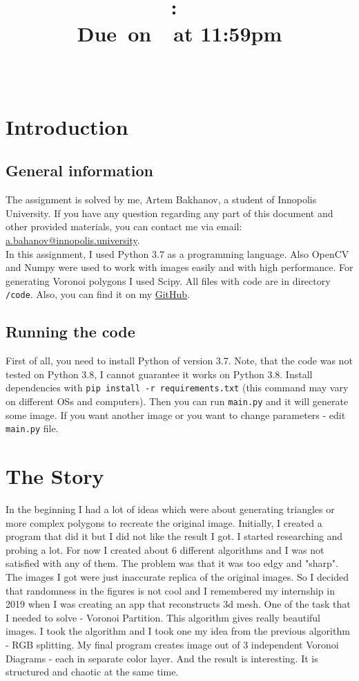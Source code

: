 \documentclass{article}
\title{
    \vspace{2in}
    \textmd{\textbf{\hmwkClass:\ \hmwkTitle}}\\
    \normalsize\vspace{0.1in}\small{Due\ on\ \hmwkDueDate\ at 11:59pm}\\
    \vspace{0.1in}\large{\textit{\hmwkClassInstructor\ }}
    \vspace{3in}
}
\author{\hmwkAuthorName}
\date{}
\begin{document}
\maketitle

\pagebreak

\tableofcontents

\pagebreak

\section{Introduction}
\subsection{General information}
    The assignment is solved by me, Artem Bakhanov, a student of Innopolis University. If you have any question regarding any part of this document and other provided materials, you can contact me via email: \href{mailto:a.bahanov@innopolis.university}{a.bahanov@innopolis.university}.\\
    In this assignment, I used Python 3.7 as a programming language. Also OpenCV and Numpy were used to work with images easily and with high performance. For generating Voronoi polygons I used Scipy. All files with code are in directory \texttt{/code}. Also, you can find it on my \href{https://github.com/artembakhanov/ComputerCanDoArt}{GitHub}.
\subsection{Running the code}
First of all, you need to install Python of version 3.7. Note, that the code was not tested on Python 3.8, I cannot guarantee it works on Python 3.8. Install dependencies with \texttt{pip install -r requirements.txt} (this command may vary on different OSs and computers). Then you can run \texttt{main.py} and it will generate some image. If you want another image or you want to change parameters - edit \texttt{main.py} file. 

\section{The Story}
In the beginning I had a lot of ideas which were about generating triangles or more complex polygons to recreate the original image. Initially, I created a program that did it but I did not like the result I got. I started researching and probing a lot. For now I created about 6 different algorithms and I was not satisfied with any of them. The problem was that it was too edgy and "sharp". The images I got were just inaccurate replica of the original images. So I decided that randomness in the figures is not cool and I remembered my internship in 2019 when I was creating an app that reconstructs 3d mesh. One of the task that I needed to solve - Voronoi Partition. This algorithm gives really beautiful images. I took the algorithm and I took one my idea from the previous algorithm - RGB splitting. My final program creates image out of 3 independent Voronoi Diagrams - each in separate color layer. And the result is interesting. It is structured and chaotic at the same time.
\end{document}
